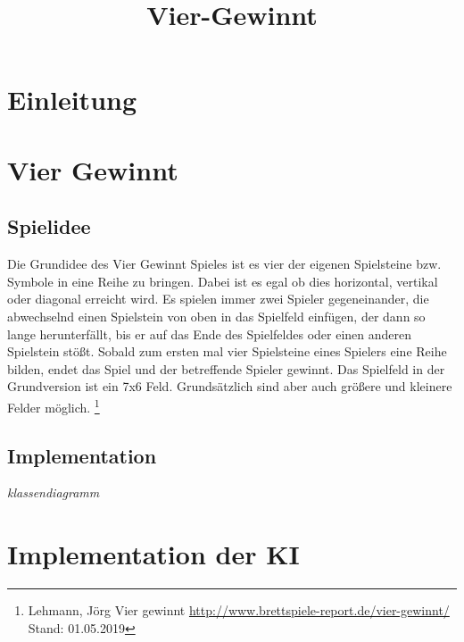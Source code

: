 \documentclass[12pt,a4paper,ngerman]{article}
\title{Vier-Gewinnt}
\author{}
\begin{document}
	\maketitle
	\newpage
	\tableofcontents
	\newpage
	\section{Einleitung}
	
	\section{Vier Gewinnt}
	\subsection{Spielidee}
	Die Grundidee des Vier Gewinnt Spieles ist es vier der eigenen Spielsteine bzw. Symbole in eine Reihe zu bringen.
	Dabei ist es egal ob dies horizontal, vertikal oder diagonal erreicht wird.
	Es spielen immer zwei Spieler gegeneinander, die abwechselnd einen Spielstein von oben in das Spielfeld einfügen, der dann so lange herunterfällt, bis er auf das Ende des Spielfeldes oder einen anderen Spielstein stößt.
	Sobald zum ersten mal vier Spielsteine eines Spielers eine Reihe bilden, endet das Spiel und der betreffende Spieler gewinnt.
	Das Spielfeld in der Grundversion ist ein 7x6 Feld. Grundsätzlich sind aber auch größere und kleinere Felder möglich.
	\footnote{Lehmann, Jörg Vier gewinnt \url{http://www.brettspiele-report.de/vier-gewinnt/} Stand: 01.05.2019}
	\subsection{Implementation}
	\textit{klassendiagramm}
	\section{Implementation der KI}
\end{document}
